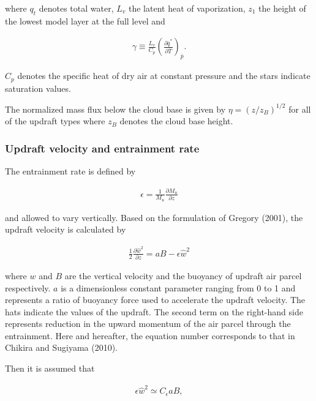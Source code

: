 where \(q_t\) denotes total water, \(L_v\) the latent heat of
vaporization, \(z_1\) the height of the lowest model layer at the full
level and

\begin{eqnarray}
 \gamma \equiv \frac{L_v}{C_p}\left(\frac{\partial \bar{q}^*}{\partial \bar{T}}\right)_{\bar{p}}.
\end{eqnarray}

\(C_p\) denotes the specific heat of dry air at constant pressure and
the stars indicate saturation values.

The normalized mass flux below the cloud base is given by
\(\eta = (z/z_B)^{1/2}\) for all of the updraft types where \(z_B\)
denotes the cloud base height.

\hypertarget{updraft-velocity-and-entrainment-rate}{%
\subsubsection{Updraft velocity and entrainment
rate}\label{updraft-velocity-and-entrainment-rate}}

The entrainment rate is defined by

\begin{eqnarray}
 \epsilon = \frac{1}{M_u}\frac{\partial M_u}{\partial z}
\end{eqnarray}

and allowed to vary vertically. Based on the formulation of Gregory
(2001), the updraft velocity is calculated by

\begin{eqnarray}
 \frac{1}{2}\frac{\partial \hat{w}^2}{\partial z} = aB - \epsilon \hat{w}^2 \label{p-cum.1}
\end{eqnarray}

where \(w\) and \(B\) are the vertical velocity and the buoyancy of
updraft air parcel respectively. \(a\) is a dimensionless constant
parameter ranging from 0 to 1 and represents a ratio of buoyancy force
used to accelerate the updraft velocity. The hats indicate the values of
the updraft. The second term on the right-hand side represents reduction
in the upward momentum of the air parcel through the entrainment. Here
and hereafter, the equation number corresponds to that in Chikira and
Sugiyama (2010).

Then it is assumed that

\begin{eqnarray}
 \epsilon \hat{w}^2 \simeq C_\epsilon a B,
\end{eqnarray}

